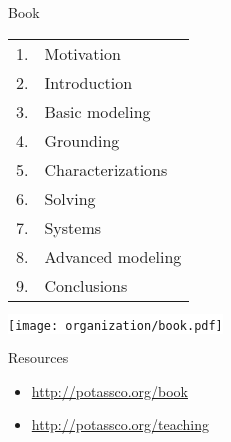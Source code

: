 \begin{frame}[c]{ Book}
  \bigskip
  \qquad\small
  \begin{tabular}[b]{rl}
    {1.}&{Motivation}\\
    {2.}&{Introduction}\\
    {3.}&{Basic modeling}\\
    {4.}&{Grounding}\\
    {5.}&{Characterizations}\\
    {6.}&{Solving}\\
    {7.}&{Systems}\\
    {8.}&{Advanced modeling}\\
    {9.}&{Conclusions}
  \end{tabular}
  \hfill
  \colorbox{white}{%
                           {\texttt{[image: organization/book.pdf]}}}
  \hfill\qquad
  \pause[3]

  \bigskip

  \begin{block}{Resources}
    \vspace{-2ex}
    \begin{itemize}\itemsep 0pt
    \item \url{http://potassco.org/book}
    \item \url{http://potassco.org/teaching}
    \end{itemize}
    \vspace{-2ex}
  \end{block}
\end{frame}
